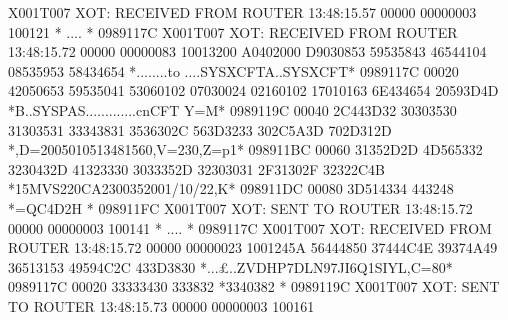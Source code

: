 \documentclass[letterpaper,10pt,english]{sphinxmanual}
\begin{document}
\begin{sphinxVerbatim}[commandchars=\\\{\}]
X001T007 XOT: RECEIVED FROM ROUTER                          13:48:15.57
00000 00000003 100121                                                         * ....                           * 0989117C
X001T007 XOT: RECEIVED FROM ROUTER                          13:48:15.72
00000 00000083 10013200 A0402000 D9030853 59535843 46544104 08535953 58434654 *........to ....SYSXCFTA..SYSXCFT* 0989117C
00020 42050653 59535041 53060102 07030024 02160102 17010163 6E434654 20593D4D *B..SYSPAS......\PYGZdl{}.......cnCFT Y=M* 0989119C
00040 2C443D32 30303530 31303531 33343831 3536302C 563D3233 302C5A3D 702D312D *,D=2005010513481560,V=230,Z=p\PYGZhy{}1\PYGZhy{}* 098911BC
00060 31352D2D 4D565332 3230432D 41323330 3033352D 32303031 2F31302F 32322C4B *15\PYGZhy{}\PYGZhy{}MVS220C\PYGZhy{}A230035\PYGZhy{}2001/10/22,K* 098911DC
00080 3D514334 443248                                                         *=QC4D2H                         * 098911FC
X001T007 XOT: SENT TO ROUTER                                13:48:15.72
00000 00000003 100141                                                         * ....                           * 0989117C
X001T007 XOT: RECEIVED FROM ROUTER 13:48:15.72
00000 00000023 1001245A 56444850 37444C4E 39374A49 36513153 49594C2C 433D3830 *...£..\PYGZdl{}ZVDHP7DLN97JI6Q1SIYL,C=80* 0989117C
00020 33333430 333832                                                         *3340382                         * 0989119C
X001T007 XOT: SENT TO ROUTER                                13:48:15.73
00000 00000003 100161
\end{sphinxVerbatim}

\end{document}
